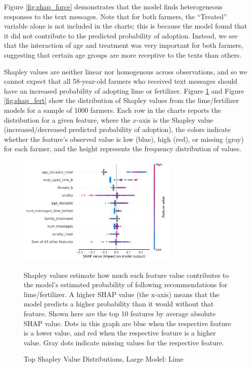 \documentclass[12pt]{article}
\begin{document}
Figure \ref{fig:shap_force} demonstrates that the model finds heterogeneous responses to the text messages. Note that for both farmers, the ``Treated'' variable alone is not included in the charts; this is because the model found that it did not contribute to the predicted probability of adoption. Instead, we see that the interaction of age and treatment was very important for both farmers, suggesting that certain age groups are more receptive to the texts than others.

Shapley values are neither linear nor homogenous across observations, and so we cannot expect that all 58-year-old farmers who received text messages should have an increased probability of adopting lime or fertilizer. Figure \ref{fig:shap_lime} and Figure \ref{fig:shap_fert} show the distribution of Shapley values from the lime/fertilizer models for a sample of 1000 farmers. Each row in the charts reports the distribution for a given feature, where the $x$-axis is the Shapley value (increased/decreased predicted probability of adoption), the colors indicate whether the feature's observed value is low (blue), high (red), or missing (gray) for each farmer, and the height represents the frequency distribution of values.

\begin{figure}[H]
    \centering
    \caption{Top Shapley Value Distributions, Large Model: Lime}
    \includegraphics[width=0.7\textwidth]{../output/shap_beeswarm_lime.pdf}
    \begin{minipage}{0.7\textwidth}
    \tiny
    Shapley values estimate how much each feature value contributes to the model's estimated probability of following recommendations for lime/fertilizer. A higher SHAP value (the x-axis) means that the model predicts a higher probability than it would without that feature. Shown here are the top 10 features by average absolute SHAP value. Dots in this graph are blue when the respective feature is a lower value, and red when the respective feature is a higher value. Gray dots indicate missing values for the respective feature.
    \end{minipage}
    \label{fig:shap_lime}
\end{figure}
\end{document}
